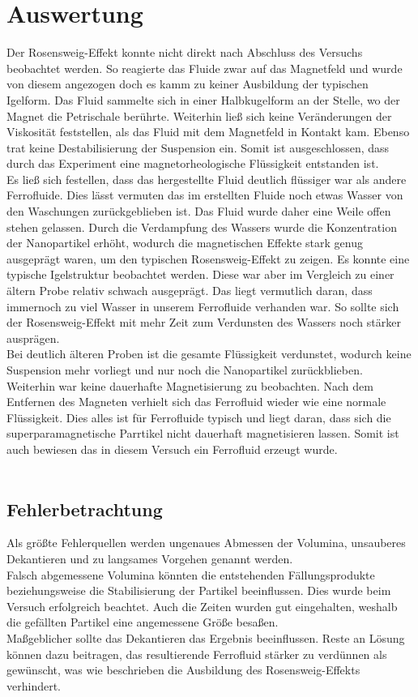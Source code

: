 \documentclass[a4paper]{TUBAFprotokoll}
\begin{document}
		\section{Auswertung}
		Der Rosensweig-Effekt konnte nicht direkt nach Abschluss des Versuchs beobachtet werden. So reagierte das Fluide zwar auf das Magnetfeld und wurde von diesem angezogen doch es kamm zu keiner Ausbildung der typischen Igelform. Das Fluid sammelte sich in einer Halbkugelform an der Stelle, wo der Magnet die Petrischale berührte. Weiterhin ließ sich keine Veränderungen der Viskosität feststellen, als das Fluid mit dem Magnetfeld in Kontakt kam. Ebenso trat keine Destabilisierung der Suspension ein. Somit ist ausgeschlossen, dass durch das Experiment eine magnetorheologische Flüssigkeit entstanden ist.\\
	Es ließ sich festellen, dass das hergestellte Fluid deutlich flüssiger war als andere Ferrofluide. Dies lässt vermuten das im erstellten Fluide noch etwas Wasser von den Waschungen zurückgeblieben ist. Das Fluid wurde daher eine Weile offen stehen gelassen. Durch die Verdampfung des Wassers wurde die Konzentration der Nanopartikel erhöht, wodurch die magnetischen Effekte stark genug ausgeprägt waren, um den typischen Rosensweig-Effekt zu zeigen. Es konnte eine typische Igelstruktur beobachtet werden. Diese war aber im Vergleich zu einer ältern Probe relativ schwach ausgeprägt. Das liegt vermutlich daran, dass immernoch zu viel Wasser in unserem Ferrofluide verhanden war. So sollte sich der Rosensweig-Effekt mit mehr Zeit zum Verdunsten des Wassers noch stärker ausprägen.\\
		Bei deutlich älteren Proben ist die gesamte Flüssigkeit verdunstet, wodurch keine Suspension mehr vorliegt und nur noch die Nanopartikel zurückblieben.\\
		Weiterhin war keine dauerhafte Magnetisierung zu beobachten. Nach dem Entfernen des Magneten verhielt sich das Ferrofluid wieder wie eine normale Flüssigkeit. Dies alles ist für Ferrofluide typisch und liegt daran, dass sich die superparamagnetische Parrtikel nicht dauerhaft magnetisieren lassen. Somit ist auch bewiesen das in diesem Versuch ein Ferrofluid erzeugt wurde.\\
		\\
		\subsection{Fehlerbetrachtung}
		Als größte Fehlerquellen werden ungenaues Abmessen der Volumina, unsauberes Dekantieren und zu langsames Vorgehen genannt werden. \\
Falsch abgemessene Volumina könnten die entstehenden Fällungsprodukte beziehungsweise die Stabilisierung der Partikel beeinflussen. Dies wurde beim Versuch 			erfolgreich beachtet. Auch die Zeiten wurden gut eingehalten, weshalb die gefällten Partikel eine angemessene Größe besaßen. \\
Maßgeblicher sollte das Dekantieren das Ergebnis beeinflussen. Reste an Lösung können dazu beitragen, das resultierende Ferrofluid stärker zu verdünnen als gewünscht, 	was wie beschrieben die Ausbildung des Rosensweig-Effekts verhindert.

	
\end{document}
